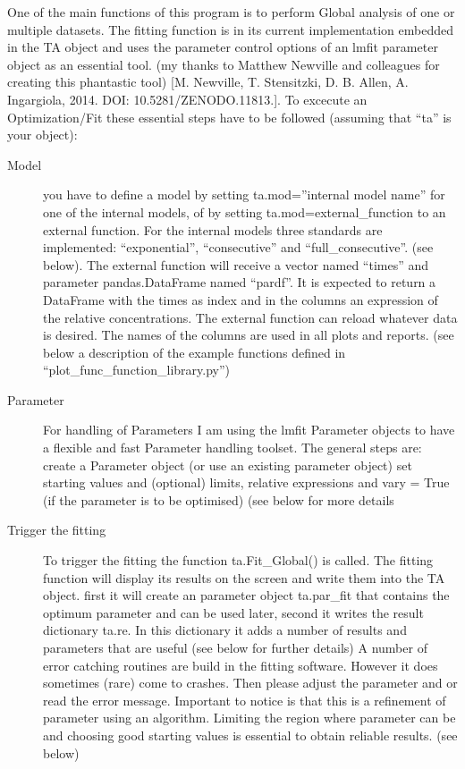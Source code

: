 \documentclass[letterpaper,10pt,english]{sphinxmanual}
\begin{document}
One of the main functions of this program is to perform Global analysis
of one or multiple datasets. The fitting function is in its current
implementation embedded in the TA object and uses the parameter control
options of an lmfit parameter object as an essential tool. (my thanks to Matthew
Newville and colleagues for creating this phantastic tool) {[}M. Newville,
T. Stensitzki, D. B. Allen, A. Ingargiola, 2014. DOI:
10.5281/ZENODO.11813.{]}. To excecute an Optimization/Fit these essential
steps have to be followed (assuming that “ta” is your object):
\begin{description}
\item[{Model}] \leavevmode
you have to define a model by setting ta.mod=”internal model name”
for one of the internal models, of by setting
ta.mod=external\_function to an external function. For the internal
models three standards are implemented: “exponential”, “consecutive”
and “full\_consecutive”. (see below). The external function will
receive a vector named “times” and parameter pandas.DataFrame named
“pardf”. It is expected to return a DataFrame with the times as index
and in the columns an expression of the relative concentrations. The
external function can reload whatever data is desired. The names of the
columns are used in all plots and reports. (see below a description
of the example functions defined in “plot\_func\_function\_library.py”)

\item[{Parameter}] \leavevmode
For handling of Parameters I am using the lmfit Parameter objects to
have a flexible and fast Parameter handling toolset. The general
steps are: create a Parameter object (or use an existing parameter
object) set starting values and (optional) limits, relative
expressions and vary = True (if the parameter is to be optimised) (see below
for more details

\item[{Trigger the fitting}] \leavevmode
To trigger the fitting the function ta.Fit\_Global() is called. The
fitting function will display its results on the screen and write
them into the TA object. first it will create an parameter object
ta.par\_fit that contains the optimum parameter and can be used later,
second it writes the result dictionary ta.re. In this dictionary it
adds a number of results and parameters that are useful (see below
for further details) A number of error catching routines are build in
the fitting software. However it does sometimes (rare) come to
crashes. Then please adjust the parameter and or read the error
message. Important to notice is that this is a refinement of
parameter using an algorithm. Limiting the region where parameter can
be and choosing good starting values is essential to obtain reliable
results. (see below)

\end{description}
\end{document}
